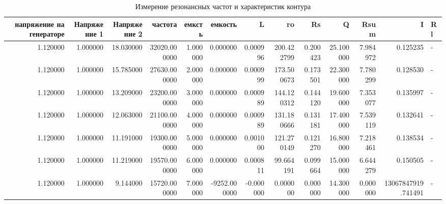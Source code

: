 \documentclass[a4paper, 12pt]{article}
\begin{document}
    \begin{table}[h!]
        \begin{tabular}{rrrrrrrrrrrrl}
            \toprule
            напряжение на генераторе & Напряжение 1 & Напряжение 2 & частота & емксть & емкость & L & ro & Rs & Q & Rsum & I & Rl \\
            \midrule
            1.120000 & 1.000000 & 18.030000 & 32020.000000 & 1.000000 & 0.000000 & 0.000996 & 200.422799 & 0.200423 & 25.100000 & 7.984972 & 0.125235 & - \\
            1.120000 & 1.000000 & 15.785000 & 27630.000000 & 2.000000 & 0.000000 & 0.000999 & 173.500673 & 0.173501 & 22.300000 & 7.780299 & 0.128530 & - \\
            1.120000 & 1.000000 & 13.209000 & 23200.000000 & 3.000000 & 0.000000 & 0.000989 & 144.120312 & 0.144120 & 19.600000 & 7.353077 & 0.135997 & - \\
            1.120000 & 1.000000 & 12.063000 & 21100.000000 & 4.000000 & 0.000000 & 0.000989 & 131.180666 & 0.131181 & 17.400000 & 7.539119 & 0.132641 & - \\
            1.120000 & 1.000000 & 11.191000 & 19300.000000 & 5.000000 & 0.000000 & 0.001000 & 121.270149 & 0.121270 & 16.800000 & 7.218461 & 0.138534 & - \\
            1.120000 & 1.000000 & 11.219000 & 19570.000000 & 6.000000 & 0.000000 & 0.000811 & 99.664191 & 0.099664 & 15.000000 & 6.644279 & 0.150505 & - \\
            1.120000 & 1.000000 & 9.144000 & 15720.000000 & 7.000000 & -9252.000000 & -0.000000 & 0.000000 & 0.000000 & 14.300000 & 0.000000 & 13067847919.741491 & - \\
            \bottomrule
            \end{tabular}
	\caption{Измерение резонансных частот и характеристик контура}
	\end{table}
\end{document}
